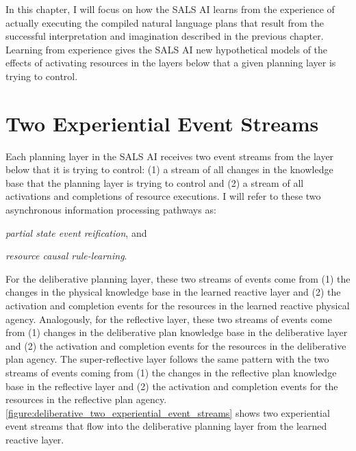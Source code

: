 In this chapter, I will focus on how the SALS AI learns from the
experience of actually executing the compiled natural language plans
that result from the successful interpretation and imagination
described in the previous chapter.  Learning from experience gives the
SALS AI new hypothetical models of the effects of activating resources
in the layers below that a given planning layer is trying to control.

\section{Two Experiential Event Streams}
\label{section:two_experiential_event_streams}

Each planning layer in the SALS AI receives two event streams from the
layer below that it is trying to control: (1) a stream of all changes
in the knowledge base that the planning layer is trying to control and
(2) a stream of all activations and completions of resource
executions.  I will refer to these two asynchronous information
processing pathways as:
\begin{packed_enumerate}
\item{{\emph{partial state event reification}}, and}
\item{{\emph{resource causal rule-learning}}.}
\end{packed_enumerate}
For the deliberative planning layer, these two streams of events come
from (1) the changes in the physical knowledge base in the learned
reactive layer and (2) the activation and completion events for the
resources in the learned reactive physical agency.  Analogously, for
the reflective layer, these two streams of events come from (1)
changes in the deliberative plan knowledge base in the deliberative
layer and (2) the activation and completion events for the resources
in the deliberative plan agency.  The super-reflective layer follows
the same pattern with the two streams of events coming from (1) the
changes in the reflective plan knowledge base in the reflective layer
and (2) the activation and completion events for the resources in the
reflective plan agency.
{\mbox{\autoref{figure:deliberative_two_experiential_event_streams}}}
shows two experiential event streams that flow into the deliberative
planning layer from the learned reactive layer.
